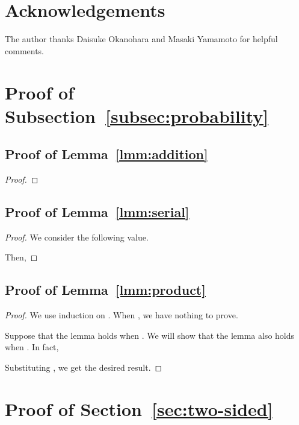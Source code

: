 \documentclass[letterpaper,11pt]{article}
\begin{document}
\newpage

\section*{Acknowledgements}
The author thanks Daisuke Okanohara and Masaki Yamamoto for helpful comments.

{}

\newpage
\appendix
\noindent {\bf\Large \appendixname}

\section{Proof of Subsection~\ref{subsec:probability}}\label{apx:probability}

\subsection{Proof of Lemma~\ref{lmm:addition}}
\begin{proof}
  
\end{proof}

\subsection{Proof of Lemma~\ref{lmm:serial}}
\begin{proof}
  We consider the following value.
  
  Then,
  
\end{proof}


\subsection{Proof of Lemma~\ref{lmm:product}}
\begin{proof}
  We use induction on .
  When , we have nothing to prove.

  Suppose that the lemma holds when .
  We will show that the lemma also holds when .
  In fact,
  
  Substituting ,
  we get the desired result.
\end{proof}

\section{Proof of Section~\ref{sec:two-sided}}\label{apx:proof-two-sided}
\end{document}
